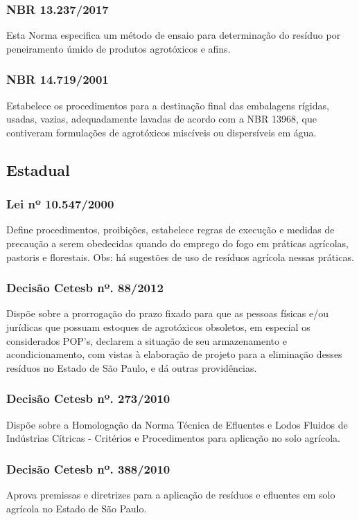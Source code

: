 \begin{subapend}
\begin{subsubapend}
		\subsubsection{NBR 13.237/2017}
		Esta Norma especifica um método de ensaio para determinação do resíduo por peneiramento úmido de produtos agrotóxicos e afins. 
		\subsubsection{NBR 14.719/2001}
		Estabelece os procedimentos para a destinação final das embalagens rígidas, usadas, vazias, adequadamente lavadas de acordo com a NBR 13968, que contiveram formulações de agrotóxicos miscíveis ou dispersíveis em água.
		\subsection{Estadual}
		\subsubsection{Lei nº 10.547/2000}
		Define procedimentos, proibições, estabelece regras de execução e medidas de precaução a serem obedecidas quando do emprego do fogo em práticas agrícolas, pastoris e florestais. Obs: há sugestões de uso de resíduos agrícola nessas práticas.
		\subsubsection{Decisão Cetesb nº. 88/2012}
		Dispõe sobre a prorrogação do prazo fixado para que as pessoas físicas e/ou jurídicas que possuam estoques de agrotóxicos obsoletos, em especial os considerados POP's, declarem a situação de seu armazenamento e acondicionamento, com vistas à elaboração de projeto para a eliminação desses resíduos no Estado de São Paulo, e dá outras providências.
		\subsubsection{Decisão Cetesb nº. 273/2010}
		Dispõe sobre a Homologação da Norma Técnica de Efluentes e Lodos Fluidos de Indústrias Cítricas - Critérios e Procedimentos para aplicação no solo agrícola.
		\subsubsection{Decisão Cetesb nº. 388/2010}
		Aprova premissas e diretrizes para a aplicação de resíduos e efluentes em solo agrícola no Estado de São Paulo.

\end{subsubapend}
\end{subapend}
